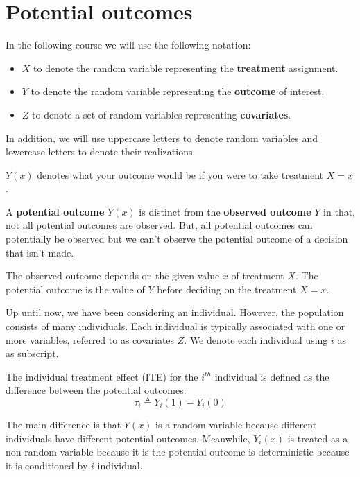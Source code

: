\chapter{Potential outcomes}
In the following course we will use the following notation:
\begin{itemize}
    \item $X$ to denote the random variable representing the \textbf{treatment}
          assignment.
    \item $Y$ to denote the random variable representing the \textbf{outcome} of
          interest.
    \item $Z$ to denote a set of random variables representing \textbf{covariates}.
\end{itemize}

In addition, we will use uppercase letters to denote random variables and lowercase
letters to denote their realizations.

\begin{definition}
    $Y(x)$ denotes what your outcome would be if you were to take treatment $X = x$.
\end{definition}
A \textbf{potential outcome} $Y(x)$ is distinct from the \textbf{observed outcome} $Y$
in that, not all potential outcomes are observed. But, all potential outcomes can potentially
be observed but we can't observe the potential outcome of a decision that isn't made.

The observed outcome depends on the given value $x$ of treatment $X$. The potential outcome
is the value of $Y$ before deciding on the treatment $X=x$.

Up until now, we have been considering an individual. However, the population
consists of many individuals. Each individual is typically associated with one or
more variables, referred to as covariates $Z$. We denote each individual using $i$
as as subscript.

\begin{definition}
    The individual treatment effect (ITE) for the $i^{th}$ individual
    is defined as the difference between the potential outcomes:
    \begin{equation}
        \tau_i \triangleq Y_i(1) - Y_i(0)
    \end{equation}

    The main difference is that $Y(x)$ is a random variable because different individuals
    have different potential outcomes. Meanwhile, $Y_i(x)$ is treated as a non-random
    variable because it is the potential outcome is deterministic because it is conditioned
    by $i$-individual.
\end{definition}

